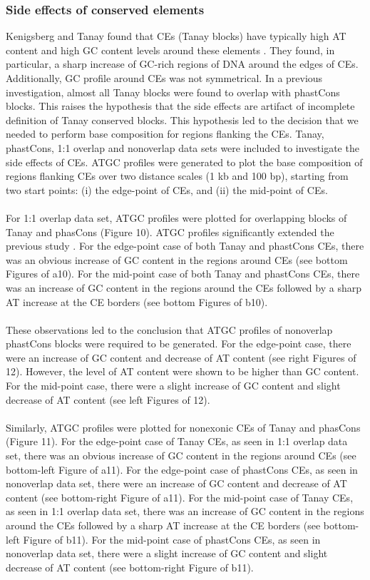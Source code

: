 \documentclass[12pt]{report}
\begin{document}
\subsubsection{Side effects of conserved elements}
Kenigsberg and Tanay found that CEs (Tanay blocks) have typically high AT content and high GC content levels around these elements \citep{Tanay2013}. They found, in particular, a sharp increase of GC-rich regions of DNA around the edges of CEs. Additionally, GC profile around CEs was not symmetrical. In a previous investigation, almost all Tanay blocks were found to overlap with phastCons blocks. This raises the hypothesis that the side effects are artifact of incomplete definition of Tanay conserved blocks. This hypothesis led to the decision that we needed to perform base composition for regions flanking the CEs. Tanay, phastCons, 1:1 overlap and nonoverlap data sets were included to investigate the side effects of CEs. ATGC profiles were generated to plot the base composition of regions flanking CEs over two distance scales (1 kb and 100 bp), starting from two start points: (i) the edge-point of CEs, and (ii) the mid-point of CEs.\\\\
For 1:1 overlap data set, ATGC profiles were plotted for overlapping blocks of Tanay and phasCons (Figure 10). ATGC profiles significantly extended the previous study \citep{Tanay2013}. For the edge-point case of both Tanay and phastCons CEs, there was an obvious increase of GC content in the regions around CEs (see bottom Figures of a10). For the mid-point case of both Tanay and phastCons CEs, there was an increase of GC content in the regions around the CEs followed by a sharp AT increase at the CE borders (see bottom Figures of b10).\\\\ 
These observations led to the conclusion that ATGC profiles of nonoverlap phastCons blocks were required to be generated. For the edge-point case, there were an increase of GC content and decrease of AT content (see right Figures of 12). However, the level of AT content were shown to be higher than GC content. For the mid-point case, there were a slight increase of GC content and slight decrease of AT content (see left Figures of 12).\\\\  
Similarly, ATGC profiles were plotted for nonexonic CEs of Tanay and phasCons (Figure 11). For the edge-point case of Tanay CEs, as seen in 1:1 overlap data set, there was an obvious increase of GC content in the regions around CEs (see bottom-left Figure of a11). For the edge-point case of phastCons CEs, as seen in nonoverlap data set, there were an increase of GC content and decrease of AT content (see bottom-right Figure of a11). For the mid-point case of Tanay CEs, as seen in 1:1 overlap data set, there was an increase of GC content in the regions around the CEs followed by a sharp AT increase at the CE borders (see bottom-left Figure of b11). For the mid-point case of phastCons CEs, as seen in nonoverlap data set, there were a slight increase of GC content and slight decrease of AT content (see bottom-right Figure of b11).\\\\
\end{document}
